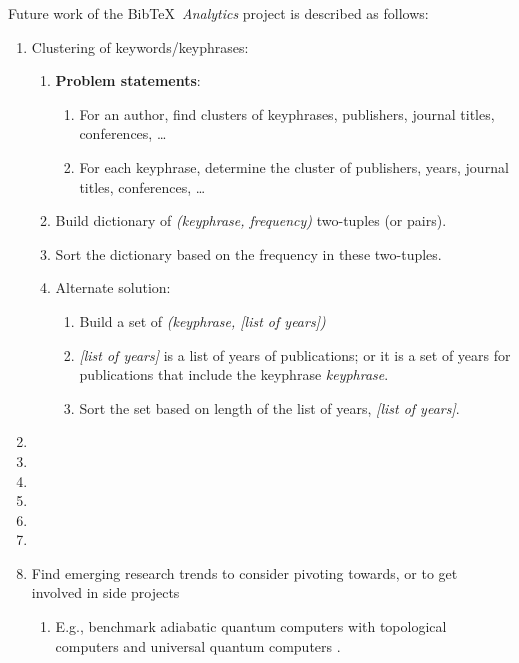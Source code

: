 Future work of the {\sc Bib}\TeX\ {\it Analytics} project is described as follows: \vspace{-0.3cm}
\begin{enumerate} \itemsep -4pt
\item Clustering of keywords/keyphrases: \vspace{-0.3cm}
	\begin{enumerate} \itemsep -2pt
	\item {\bf Problem statements}: \vspace{-0.2cm}
		\begin{enumerate} \itemsep -2pt
		\item For an author, find clusters of keyphrases, publishers, journal titles, conferences, \dots
		\item For each keyphrase, determine the cluster of publishers, years, journal titles, conferences, \dots
		\end{enumerate}
	\item Build dictionary of {\it (keyphrase, frequency)} two-tuples (or pairs).
	\item Sort the dictionary based on the frequency in these two-tuples.
	\item Alternate solution: \vspace{-0.2cm}
		\begin{enumerate} \itemsep -2pt
		\item Build a set of {\it (keyphrase, [list of years])}
		\item {\it [list of years]} is a list of years of publications; or it is a set of years for publications that include the keyphrase {\it keyphrase}.
		\item Sort the set based on length of the list of years, {\it [list of years]}.
		\end{enumerate}
	\end{enumerate}
\item 
\item 
\item 
\item 
\item 
\item 
\item Find emerging research trends to consider pivoting towards, or to get involved in side projects \vspace{-0.3cm}
	\begin{enumerate} \itemsep -2pt
	\item E.g., benchmark adiabatic quantum computers with topological computers and universal quantum computers \cite{Tandon2017}.
	\end{enumerate}
\end{enumerate}


























